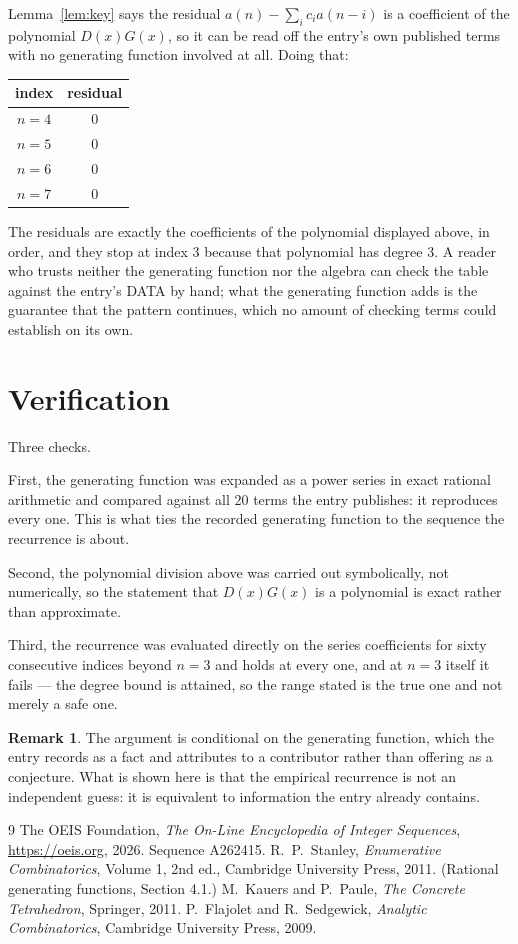 \documentclass[11pt,a4paper]{article}
\theoremstyle{plain}
\theoremstyle{definition}
\newtheorem{remark}[theorem]{Remark}
\begin{document}
Lemma~\ref{lem:key} says the residual $a(n)-\sum_ic_ia(n-i)$ is a coefficient of the
polynomial $D(x)G(x)$, so it can be read off the entry's own published terms with no
generating function involved at all. Doing that:
\begin{center}
\begin{tabular}{cc}
index & residual \\ \hline
$n=4$ & $0$ \\
$n=5$ & $0$ \\
$n=6$ & $0$ \\
$n=7$ & $0$
\end{tabular}
\end{center}
The residuals are exactly the coefficients of the polynomial displayed above, in order, and
they stop at index $3$ because that polynomial has degree $3$. A reader who trusts
neither the generating function nor the algebra can check the table against the entry's DATA
by hand; what the generating function adds is the guarantee that the pattern continues, which
no amount of checking terms could establish on its own.

\section{Verification}

Three checks.

First, the generating function was expanded as a power series in exact rational arithmetic and
compared against all $20$ terms the entry publishes: it reproduces every one. This is
what ties the recorded generating function to the sequence the recurrence is about.

Second, the polynomial division above was carried out symbolically, not numerically, so the
statement that $D(x)G(x)$ is a polynomial is exact rather than approximate.

Third, the recurrence was evaluated directly on the series coefficients for sixty consecutive
indices beyond $n=3$ and holds at every one, and at $n=3$ itself it fails --- the
degree bound is attained, so the range stated is the true one and not merely a safe one.

\begin{remark}
The argument is conditional on the generating function, which the entry records as a fact and
attributes to a contributor rather than offering as a conjecture. What is shown here is that
the empirical recurrence is not an independent guess: it is equivalent to information the
entry already contains.
\end{remark}

\begin{thebibliography}{9}
 The OEIS Foundation, \emph{The On-Line Encyclopedia of Integer
Sequences}, \url{https://oeis.org}, 2026. Sequence A262415.
 R.~P.~Stanley, \emph{Enumerative Combinatorics}, Volume 1, 2nd ed.,
Cambridge University Press, 2011. (Rational generating functions, Section 4.1.)
 M.~Kauers and P.~Paule, \emph{The Concrete Tetrahedron}, Springer, 2011.
 P.~Flajolet and R.~Sedgewick, \emph{Analytic Combinatorics}, Cambridge
University Press, 2009.
\end{thebibliography}
\end{document}
